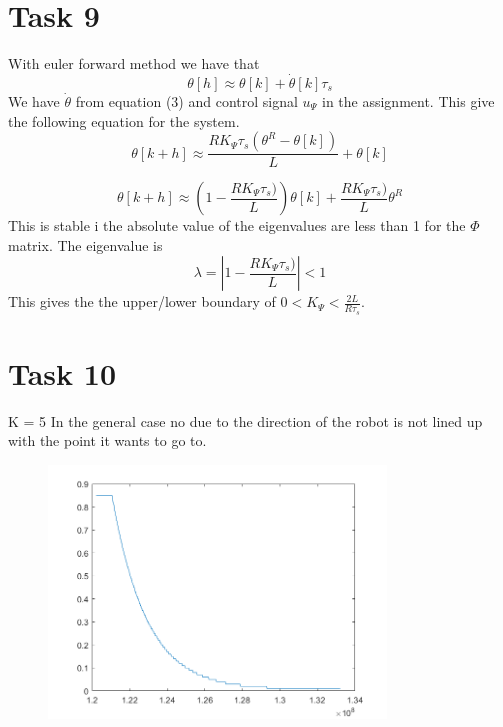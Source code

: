 \documentclass[a4paper,12pt,oneside,onecolumn]{article} %
\begin{document}
\section*{Task 9}
With euler forward method we have that
\begin{equation*}
\theta[h]\approx \theta[k]+\dot{\theta}[k]\tau_s
\end{equation*}
We have $\dot{\theta}$ from equation (3) and control signal $u_\Psi$ in the assignment. This give the following equation for the system.
\begin{equation*}
\theta[k+h]\approx  \frac{R K_\Psi \tau_s(\theta^R-\theta[k])}{L}+\theta[k]
\end{equation*}

\begin{equation*}
\theta[k+h]\approx  (1-\frac{R K_\Psi \tau_s)}{L})\theta[k]+\frac{R K_\Psi \tau_s)}{L}\theta^R
\end{equation*}
This is stable i the absolute value of the eigenvalues are less than 1 for the $\Phi$ matrix. The eigenvalue is
\begin{equation*}
\lambda = |1-\frac{R K_\Psi \tau_s)}{L}|<1
\end{equation*}
This gives the the upper/lower boundary of $0<K_\Psi<\frac{2L}{R\tau_s}$.
\section*{Task 10}
K = 5
In the general case no due to the direction of the robot is not lined up with the point it wants to go to. 
\begin{figure}[H]
\begin{center}	
  \includegraphics[width = 0.8\textwidth]{task10.png}
 \end{center}
\end{figure}
\end{document}
